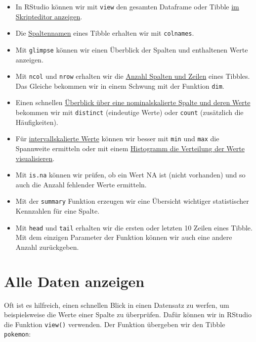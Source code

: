 \documentclass[
]{book}
\providecommand{\tightlist}{%
  \setlength{\itemsep}{0pt}\setlength{\parskip}{0pt}}
\begin{document}
\begin{itemize}
\tightlist
\item
  In RStudio können wir mit \texttt{view} den gesamten Dataframe oder Tibble \protect\hyperlink{alle-daten-anzeigen}{im Skripteditor anzeigen}.
\item
  Die \protect\hyperlink{spaltennamen-ermitteln}{Spaltennamen} eines Tibble erhalten wir mit \texttt{colnames}.
\item
  Mit \texttt{glimpse} können wir einen Überblick der Spalten und enthaltenen Werte anzeigen.
\item
  Mit \texttt{ncol} und \texttt{nrow} erhalten wir die \protect\hyperlink{anzahl-spalten-zeilen}{Anzahl Spalten und Zeilen} eines Tibbles. Das Gleiche bekommen wir in einem Schwung mit der Funktion \texttt{dim}.
\item
  Einen schnellen \protect\hyperlink{wertebereich-nominalskaliert}{Überblick über eine nominalskalierte Spalte und deren Werte} bekommen wir mit \texttt{distinct} (eindeutige Werte) oder \texttt{count} (zusätzlich die Häufigkeiten).
\item
  Für \protect\hyperlink{wertebereich-intervallskaliert}{intervallskalierte Werte} können wir besser mit \texttt{min} und \texttt{max} die Spannweite ermitteln oder mit einem \protect\hyperlink{wertebereich-intervallskaliert-histogramm}{Histogramm die Verteilung der Werte visualisieren}.
\item
  Mit \texttt{is.na} können wir prüfen, ob ein Wert NA ist (nicht vorhanden) und so auch die Anzahl fehlender Werte ermitteln.
\item
  Mit der \texttt{summary} Funktion erzeugen wir eine Übersicht wichtiger statistischer Kennzahlen für eine Spalte.
\item
  Mit \texttt{head} und \texttt{tail} erhalten wir die ersten oder letzten 10 Zeilen eines Tibble. Mit dem einzigen Parameter der Funktion können wir auch eine andere Anzahl zurückgeben.
\end{itemize}

\hypertarget{alle-daten-anzeigen}{%
\section{Alle Daten anzeigen}\label{alle-daten-anzeigen}}

Oft ist es hilfreich, einen schnellen Blick in einen Datensatz zu werfen, um beispielsweise die Werte einer Spalte zu überprüfen. Dafür können wir in RStudio die Funktion \texttt{view()} verwenden. Der Funktion übergeben wir den Tibble \texttt{pokemon}:
\end{document}
